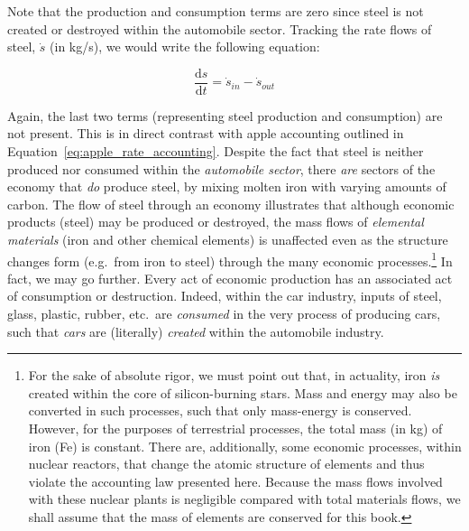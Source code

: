 Note that the production and consumption terms are zero
since steel is not created or destroyed within the automobile
sector. Tracking the rate flows of steel, 
$\dot{s}$ (in kg/s),
we would write the following equation:

\begin{equation}
	\frac{\mathrm{d}s}{\mathrm{d}t}
	= \dot{s}_{in}
	- \dot{s}_{out}
\end{equation}


Again, the last two terms 
(representing steel production and consumption) 
are not present. 
This is in direct contrast with apple 
accounting outlined in Equation~\ref{eq:apple_rate_accounting}. 
Despite the fact that steel is neither produced nor consumed 
within the \emph{automobile sector}, 
there \emph{are} sectors of the economy 
that \emph{do} produce steel,
by mixing molten iron with varying amounts of carbon. 
The flow of steel through an economy illustrates that 
although economic products (steel) 
may be produced or destroyed, 
the mass flows of \emph{elemental materials} 
(iron and other chemical elements)
is unaffected even as the structure changes form (e.g.\ from iron to steel) 
through the many economic processes.\footnote{For the sake of
absolute rigor, we must point out that, in actuality, iron \emph{is} created within
the core of silicon-burning stars. 
Mass and energy may also be converted in such processes, 
such that only mass-energy is conserved. 
However, for the purposes of terrestrial
processes, the total mass (in kg) of iron (Fe) is constant. 
There are, additionally, some economic
processes, within nuclear reactors, that change the atomic structure of elements
and thus violate the accounting law presented here. 
Because the mass flows involved
with these nuclear plants is negligible compared with total materials flows, we
shall assume that the mass of elements are conserved for this book.}
In fact, we may go further.
Every act of economic production
has an associated act of consumption or destruction.
Indeed, within the car industry, inputs of steel, glass, plastic, rubber, etc.\ 
are \emph{consumed} in the very process of producing cars, 
such that \emph{cars} are (literally) \emph{created}
within the automobile industry. 
